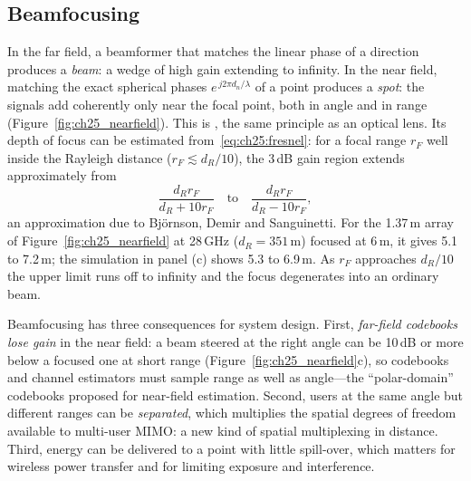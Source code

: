 
\subsection{Beamfocusing}

In the far field, a beamformer that matches the linear phase of a direction produces a \emph{beam}:
a wedge of high gain extending to infinity. In the near field, matching the exact spherical phases
$e^{\,j2\pi d_n/\lambda}$ of a point produces a \emph{spot}: the signals add coherently only near the
focal point, both in angle and in range (Figure~\ref{fig:ch25_nearfield}). This is
, the same principle as an optical lens. Its depth of focus can be estimated
from~\eqref{eq:ch25:fresnel}: for a focal range $r_F$ well inside the Rayleigh distance
($r_F\lesssim d_R/10$), the 3\,dB gain region extends approximately from
\begin{equation}
\frac{d_Rr_F}{d_R+10r_F}\quad\text{to}\quad\frac{d_Rr_F}{d_R-10r_F},
\label{eq:ch25:depth}
\end{equation}
an approximation due to Bj\"ornson, Demir and Sanguinetti. For the 1.37\,m array of
Figure~\ref{fig:ch25_nearfield} at 28\,GHz ($d_R=351$\,m) focused at 6\,m, it gives 5.1 to 7.2\,m;
the simulation in panel (c) shows 5.3 to 6.9\,m. As $r_F$ approaches $d_R/10$ the upper limit runs off
to infinity and the focus degenerates into an ordinary beam.

Beamfocusing has three consequences for system design. First, \emph{far-field codebooks lose gain}
in the near field: a beam steered at the right angle can be 10\,dB or more below a focused one at
short range (Figure~\ref{fig:ch25_nearfield}c), so codebooks and channel estimators must sample range
as well as angle---the ``polar-domain'' codebooks proposed for near-field estimation. Second, users at
the same angle but different ranges can be \emph{separated}, which multiplies the spatial degrees of
freedom available to multi-user MIMO: a new kind of spatial multiplexing in distance. Third,
energy can be delivered to a point with little spill-over, which matters for wireless power transfer
and for limiting exposure and interference.

